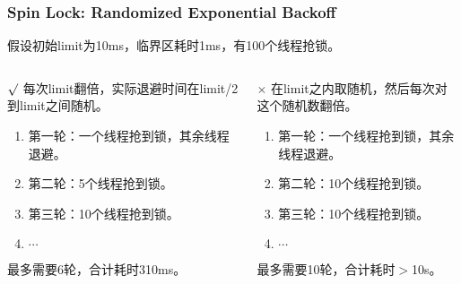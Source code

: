 \documentclass[UTF8,lualatex]{ctexbeamer}
\begin{document}
\begin{frame}
    \frametitle{Spin Lock: Randomized Exponential Backoff}
    \begin{center}
        假设初始limit为10ms，临界区耗时1ms，有100个线程抢锁。
    \end{center}
    \begin{columns}[t]
        \begin{column}{.5\textwidth}
            \begin{exampleblock}{$\surd$}
                每次limit翻倍，实际退避时间在limit/2到limit之间随机。
                \begin{enumerate}
                    \item 第一轮：一个线程抢到锁，其余线程退避。
                    \item 第二轮：5个线程抢到锁。
                    \item 第三轮：10个线程抢到锁。
                    \item $\cdots$
                \end{enumerate}
                最多需要6轮，合计耗时310ms。
            \end{exampleblock}
        \end{column}
        \begin{column}{.5\textwidth}
            \begin{alertblock}{$\times$}
                在limit之内取随机，然后每次对这个随机数翻倍。
                \begin{enumerate}
                    \item 第一轮：一个线程抢到锁，其余线程退避。
                    \item 第二轮：10个线程抢到锁。
                    \item 第三轮：10个线程抢到锁。
                    \item $\cdots$
                \end{enumerate}
                最多需要10轮，合计耗时$>$10s。
            \end{alertblock}
        \end{column}
    \end{columns}
\end{frame}

\end{document}
